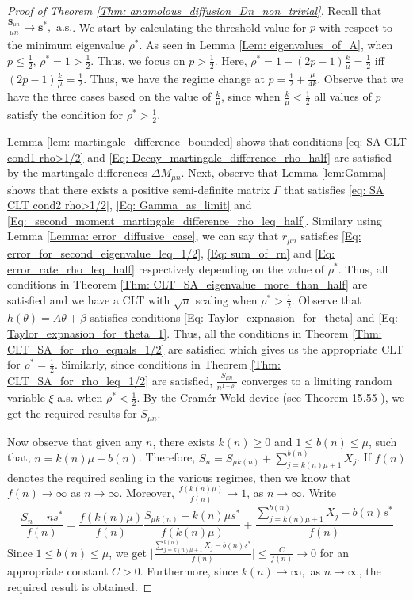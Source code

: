 \documentclass{article}
\numberwithin{equation}{section}
\newcommand{\1}{\mathbf{1}}
\newcommand{\0}{\mathbf{0}}
\newcommand{\bS}{\mathbf{S}}
\newcommand{\bs}{\mathbf{s}}
\begin{document}
\begin{proof}[Proof of Theorem \ref{Thm: anamolous_diffusion_Dn_non_trivial}]
Recall that $\frac{\bS_{\mu n}}{\mu n} \longrightarrow  \bs^*, \text{ a.s.}$. 
We start by calculating the threshold value for $p$ with respect to the minimum eigenvalue $\rho^*$.
As seen in Lemma \ref{Lem: eigenvalues_of_A}, when $p\leq \frac{1}{2}$, $\rho^* = 1 > \frac{1}{2}$. Thus, we focus on $p>\frac{1}{2}$. Here, $\rho^* = 1-(2p-1)\frac{k}{\mu} = \frac{1}{2}$ iff $(2p-1)\frac{k}{\mu} = \frac{1}{2}$. Thus, we have the regime change at $p= \frac{1}{2} + \frac{\mu}{4k}$. Observe that we have the three cases based on the value of $\frac{k}{\mu}$, since when $\frac{k}{\mu} < \frac{1}{2}$ all values of $p$ satisfy the condition for $\rho^* > \frac{1}{2}$.

Lemma \ref{lem: martingale_difference_bounded} shows that conditions \eqref{eq: SA CLT cond1 rho>1/2} and \eqref{Eq: Decay_martingale_difference_rho_half} are satisfied by the martingale differences $\Delta M_{\mu n}$.
Next, observe that Lemma \ref{lem:Gamma} shows that there exists a positive semi-definite matrix $\Gamma$ that satisfies \eqref{eq: SA CLT cond2 rho>1/2}, \eqref{Eq: Gamma_as_limit} and \eqref{Eq:_second_moment_martingale_difference_rho_leq_half}. Similary using Lemma \ref{Lemma: error_diffusive_case}, we can say that $r_{\mu n}$ satisfies \eqref{Eq: error_for_second_eigenvalue_leq_1/2}, \eqref{Eq: sum_of_rn} and \eqref{Eq: error_rate_rho_leq_half} respectively depending on the value of $\rho^*$. 
Thus, all conditions in Theorem \ref{Thm: CLT_SA_eigenvalue_more_than_half} are satisfied and we have a CLT with $\sqrt{n}$ scaling when $\rho^* > \frac{1}{2}$. 
Observe that $h(\theta) = A \theta + \beta$ satisfies conditions \eqref{Eq: Taylor_expnasion_for_theta} and \eqref{Eq: Taylor_expnasion_for_theta_1}.
Thus, all the conditions in Theorem \ref{Thm: CLT_SA_for_rho_equals_1/2} are satisfied which gives us the appropriate CLT for $\rho^* = \frac{1}{2}$. Similarly, since conditions in Theorem \ref{Thm: CLT_SA_for_rho_leq_1/2} are satisfied, $\frac{S_{\mu n}}{n^{1-\rho^*}}$ converges to a limiting random variable $\xi$ a.s. when $\rho^* < \frac{1}{2}$.
By the Cram\'{e}r-Wold device (see Theorem 15.55 \cite{klenke2008probability}), we get the required results for $S_{\mu n}$.

Now observe that given any $n$, there exists $k(n) \ge 0$ and $1 \le b(n) \le \mu$, such that, $n = k(n) \mu + b(n)$. Therefore, $S_{n}= S_{ \mu k(n)}+ \sum_{j=k(n) \mu +1}^{b(n)}X_j$. If $f(n)$ denotes the required scaling in the various regimes, then we know that $f(n)\longrightarrow \infty $ as $n \to \infty$. Moreover, $\frac{f(k(n)\mu)}{f(n)} \longrightarrow 1$, as $n \to \infty$.  Write 
\[
\frac{S_n - n s^*}{f(n)}= \frac{f(k(n)\mu)}{f(n)}\frac{S_{ \mu k(n)} - k(n)\mu s^*}{f(k(n)\mu)}+ \frac{\sum_{j=k(n) \mu +1}^{b(n)}X_j - b(n) s^*}{f(n)} 
\]
Since $1 \le b(n) \le \mu$, we get $\Big | \frac{\sum_{j=k(n) \mu +1}^{b(n)}X_j - b(n) s^*}{f(n)}\Big | \le \frac{C}{f(n)} \longrightarrow 0$ for an appropriate constant $C>0$. Furthermore, since $k(n) \longrightarrow \infty,$ as $n \to \infty$, the required result is obtained.
\end{proof}
\end{document}
